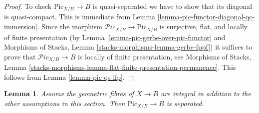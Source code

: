 \documentclass{stacks-project}
\theoremstyle{plain}
\newtheorem{lemma}[subsection]{Lemma}
\theoremstyle{definition}
\theoremstyle{remark}
\numberwithin{equation}{subsection}
\def\Picardstack{\mathcal{P}\!\mathit{ic}}
\def\Picardfunctor{\mathrm{Pic}}
\begin{document}
\begin{proof}
To check $\Picardfunctor_{X/B} \to B$ is quasi-separated we have to
show that its diagonal is quasi-compact. This is immediate from
Lemma \ref{lemma-pic-functor-diagonal-qc-immersion}.
Since the morphism $\Picardstack_{X/B} \to \Picardfunctor_{X/B}$
is surjective, flat, and locally of finite presentation
(by Lemma \ref{lemma-pic-gerbe-over-pic-functor} and
Morphisms of Stacks, Lemma \ref{stacks-morphisms-lemma-gerbe-fppf})
it suffices to prove that $\Picardstack_{X/B} \to B$
is locally of finite presentation, see
Morphisms of Stacks, Lemma
\ref{stacks-morphisms-lemma-flat-finite-presentation-permanence}.
This follows
from Lemma \ref{lemma-pic-qs-lfp}.
\end{proof}

\begin{lemma}
\label{lemma-pic-functor-uniqueness-part}
Assume the geometric fibres of $X \to B$ are integral
in addition to the other assumptions in this section.
Then $\Picardfunctor_{X/B} \to B$ is separated.
\end{lemma}
\end{document}
